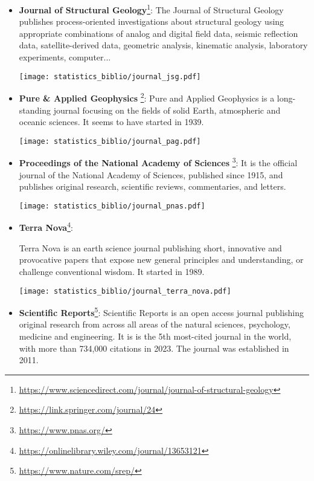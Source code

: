 \begin{itemize}
\item {\bf Journal of Structural Geology}\footnote{\url{https://www.sciencedirect.com/journal/journal-of-structural-geology}}:
The Journal of Structural Geology publishes process-oriented investigations about structural 
geology using appropriate combinations of analog and digital field data, seismic reflection data, 
satellite-derived data, geometric analysis, kinematic analysis, laboratory experiments, computer... 
\begin{center}
\texttt{[image: statistics\_biblio/journal\_jsg.pdf]}
\end{center}

\item {\bf Pure \& Applied Geophysics}
\footnote{\url{https://link.springer.com/journal/24}}:
Pure and Applied Geophysics is a long-standing journal focusing on the fields 
of solid Earth, atmospheric and oceanic sciences. 
It seems to have started in 1939.
\begin{center}
\texttt{[image: statistics\_biblio/journal\_pag.pdf]}
\end{center}

\item {\bf Proceedings of the National Academy of Sciences}
\footnote{\url{https://www.pnas.org/}}:
It is the official journal of the National Academy of Sciences, published 
since 1915, and publishes original research, scientific reviews, commentaries, and letters.
\begin{center}
\texttt{[image: statistics\_biblio/journal\_pnas.pdf]}
\end{center}

\item {\bf Terra Nova}\footnote{\url{https://onlinelibrary.wiley.com/journal/13653121}}:

Terra Nova is an earth science journal publishing short, innovative and 
provocative papers that expose new general principles and understanding, 
or challenge conventional wisdom. It started in 1989. 

\begin{center}
\texttt{[image: statistics\_biblio/journal\_terra\_nova.pdf]}
\end{center}

\item {\bf Scientific Reports}\footnote{\url{https://www.nature.com/srep/}}:
Scientific Reports is an open access journal publishing original research from across 
all areas of the natural sciences, psychology, medicine and engineering.
It is is the 5th most-cited journal in the world, with more than 734,000 citations in 2023.
The journal was established in 2011.



\end{itemize}
